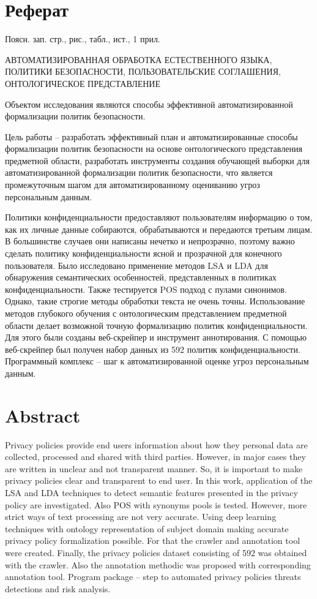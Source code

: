 \documentclass[../main]{subfiles}
\begin{document}
\newpage
{}
\section*{Реферат}
Поясн. зап.  стр.,   рис.,  табл.,  ист., 1 прил.

\begin{jje}
    \MakeUppercase{автоматизированная обработка естественного языка, политики безопасности, пользовательские соглашения, онтологическое представление}
\end{jje}

Объектом  исследования являются способы эффективной автоматизированной формализации политик безопасности.

Цель работы -- разработать эффективный план и автоматизированные способы формализации политик безопасности на основе онтологического представления предметной области, разработать инструменты создания обучающей выборки для автоматизированной формализации политик безопасности, что является промежуточным шагом для автоматизированному оцениванию угроз персональным данным.

Политики конфиденциальности предоставляют пользователям информацию о том, как их личные данные собираются, обрабатываются и передаются третьим лицам. В большинстве случаев они написаны нечетко и непрозрачно, поэтому важно сделать политику конфиденциальности ясной и прозрачной для конечного пользователя. Было исследовано применение методов LSA и LDA для обнаружения семантических особенностей, представленных в политиках конфиденциальности. Также тестируется POS подход с пулами синонимов. Однако, такие строгие методы обработки текста не очень точны. Использование методов глубокого обучения с онтологическим представлением предметной области делает возможной точную формализацию политик конфиденциальности. Для этого были созданы веб-скрейпер и инструмент аннотирования. С помощью веб-скрейпер был получен набор данных из 592 политик конфиденциальности. Программный комплекс -- шаг к автоматизированной оценке угроз персональным данным.

\newpage
\section*{Abstract}
Privacy policies provide end users information about how they personal data are collected, processed and shared with third parties. However, in major cases they are written in unclear and not transparent manner. So, it is important to make privacy  policies clear and transparent to end user. In this work, application of the LSA and LDA techniques to detect semantic features presented in the privacy policy are investigated. Also POS with synonyms pools is tested. However, more strict ways of text processing are not very accurate. Using deep learning techniques with ontology representation of subject domain making accurate privacy policy formalization possible. For that the crawler and annotation tool were created. Finally, the privacy policies dataset consisting of 592 was obtained with the crawler. Also the annotation methodic was proposed with corresponding annotation tool. Program package -- step to automated privacy policies threats detections and risk analysis.
\end{document}
